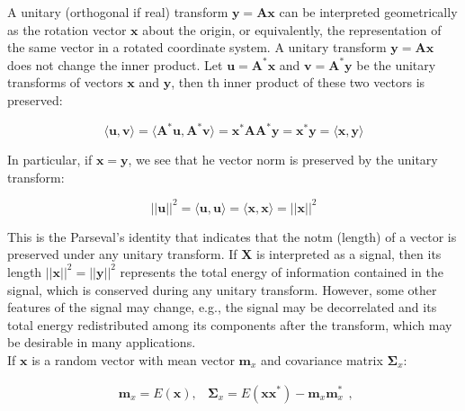 \documentclass[10pt,b5paper,titlepage]{book}
\begin{document}
\begin{itemize}
        A unitary (orthogonal if real) transform $\mathbf{y} = \mathbf{A} \mathbf{x}$
        can be interpreted geometrically as the rotation vector $\mathbf{x}$
        about the origin, or equivalently, the representation of the same vector
        in a rotated coordinate system. A unitary transform
        $\mathbf{y} = \mathbf{A} \mathbf{x}$ does not change the inner product.
        Let $\mathbf{u} = \mathbf{A}^{*} \mathbf{x}$ and
        $\mathbf{v} = \mathbf{A}^{*} \mathbf{y}$ be the unitary transforms of
        vectors  $\mathbf{x}$ and  $\mathbf{y}$, then th inner product of these
        two vectors is preserved:

        \begin{equation}
            \langle \mathbf{u}, \mathbf{v} \rangle =
            \langle \mathbf{A}^{*} \mathbf{u}, \mathbf{A}^{*} \mathbf{v} \rangle =
            \mathbf{x}^{*} \mathbf{A} \mathbf{A}^{*} \mathbf{y} =
            \mathbf{x}^{*} \mathbf{y} =
            \langle \mathbf{x}, \mathbf{y} \rangle
        \end{equation}

        In particular, if $\mathbf{x} = \mathbf{y}$, we see that he vector norm
        is preserved by the unitary transform:

        \begin{equation}
            ||\mathbf{u}||^{2} = \langle{\mathbf{u}, \mathbf{u}}\rangle
            = \langle{\mathbf{x}, \mathbf{x}}\rangle = ||\mathbf{x}||^{2}
        \end{equation}

        This is the Parseval's identity that indicates that the notm (length)
        of a vector is preserved under any unitary transform. If $\mathbf{X}$
        is interpreted as a signal, then its length
        $||\mathbf{x}||^{2} = ||\mathbf{y}||^{2}$ represents the total energy
        of information contained in the signal, which is conserved during any
        unitary transform. However, some other features of the signal may change,
        e.g., the signal may be decorrelated and its total energy redistributed
        among its components after the transform, which may be desirable in many
        applications.\\

        If $\mathbf{x}$ is a random vector with mean vector  $\mathbf{m}_x$
        and covariance matrix  $\mathbf{\Sigma}_x$:

        \begin{equation}
            \begin{array}{lr}
                \mathbf{m}_{x} = E(\mathbf{x}), &
                \mathbf{\Sigma}_x = E(\mathbf{x} \mathbf{x}^{*}) - \mathbf{m}_x \mathbf{m}_x^{*}
            \end{array}
        ,\end{equation}


\end{itemize}
\end{document}
